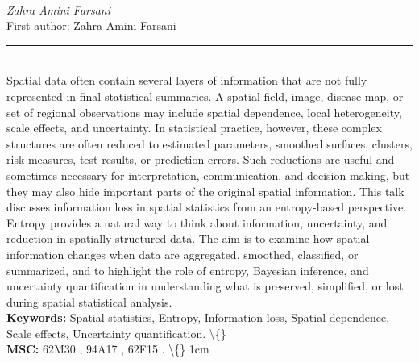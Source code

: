 \documentclass[10pt,twoside]{article}
\begin{document}
\noindent\begin{minipage}[t][\textheight]{\textwidth}
\\[0.35em]
{\itshape Zahra Amini Farsani}\\[0.2em]
{\footnotesize First author: Zahra Amini Farsani}\\[0.45em]
\noindent\rule{\textwidth}{0.3pt}\\[0.4em]
{\footnotesize  Spatial data often contain several layers of information that are not fully represented in final statistical summaries. A spatial field, image, disease map, or set of regional observations may include spatial dependence, local heterogeneity, scale effects, and uncertainty. In statistical practice, however, these complex structures are often reduced to estimated parameters, smoothed surfaces, clusters, risk measures, test results, or prediction errors. Such reductions are useful and sometimes necessary for interpretation, communication, and decision-making, but they may also hide important parts of the original spatial information. This talk discusses information loss in spatial statistics from an entropy-based perspective. Entropy provides a natural way to think about information, uncertainty, and reduction in spatially structured data. The aim is to examine how spatial information changes when data are aggregated, smoothed, classified, or summarized, and to highlight the role of entropy, Bayesian inference, and uncertainty quantification in understanding what is preserved, simplified, or lost during spatial statistical analysis.}\\[0.4em]
{\footnotesize\bfseries Keywords:} {\footnotesize Spatial statistics, Entropy, Information loss, Spatial dependence, Scale effects, Uncertainty quantification. \textbackslash\{\}}\\[0.15em]
{\footnotesize\bfseries MSC:} {\footnotesize 62M30 , 94A17 , 62F15 . \textbackslash\{\} 1cm}\\
\vfill
\end{minipage}
\newpage
\end{document}
